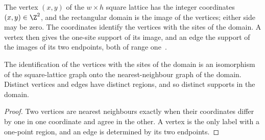 \begin{definition}
    \label{def:sites_rectangle_domain}
    \leanok
    The vertex $(x,y)$ of the $w\times h$ square lattice has the integer coordinates
    $(x,y)\in\Z^2$, and the rectangular domain is the image of the vertices; either
    side may be zero. The coordinates identify the vertices with the sites of the
    domain. A vertex then gives the one-site support of its image, and an edge the
    support of the images of its two endpoints, both of range
    one~\cite{OpenAI2026AreaLaw, OpenAI2026PolynomialPEPS}.
\end{definition}

\begin{lemma}
    \label{lem:sites_rectangle_domain}
    \leanok
    The identification of the vertices with the sites of the domain is an isomorphism
    of the square-lattice graph onto the nearest-neighbour graph of the domain. Distinct
    vertices and edges have distinct regions, and so distinct supports in the domain.
\end{lemma}
\begin{proof}\leanok
    Two vertices are nearest neighbours exactly when their coordinates differ by one in
    one coordinate and agree in the other. A vertex is the only label with a one-point
    region, and an edge is determined by its two endpoints.
\end{proof}
